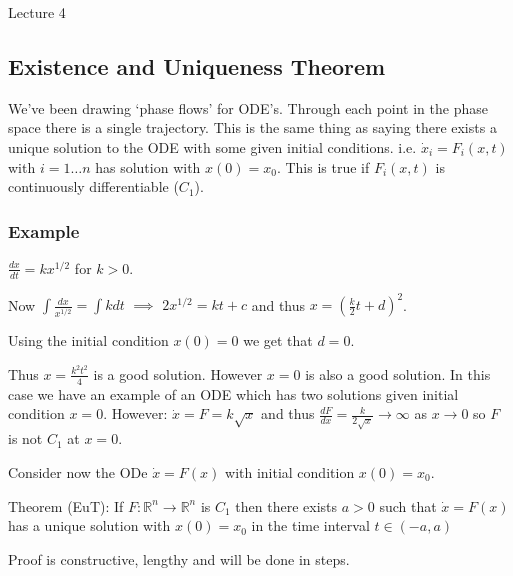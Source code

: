 \begin{center}

Lecture 4

\end{center}

\subsection{Existence and Uniqueness Theorem}

We've been drawing `phase flows' for ODE's. Through each point in the phase space there is a single trajectory. This is the same thing as saying there exists a unique solution to the ODE with some given initial conditions. i.e. $\dot{x}_i = F_i(x,t)$ with $i = 1 \ldots n$ has solution with $x(0) = x_0$. This is true if $F_i(x,t)$ is continuously differentiable ($C_1$).

\subsubsection{Example}

$\frac{dx}{dt} = k x^{1/2}$ for $k>0$.

Now $\int \frac{dx}{x^{1/2}} = \int k dt$ $\implies$ $2x^{1/2} = kt + c$ and thus $x = (\frac{k}{2} t + d)^2$.

Using the initial condition $x(0) = 0$ we get that $d=0$.

Thus $x = \frac{k^2 t^2}{4}$ is a good solution. However $x=0$ is also a good solution. In this case we have an example of an ODE which has two solutions given initial condition $x=0$. However: $\dot{x} = F = k \sqrt{x}$ and thus $\frac{dF}{dx} = \frac{k}{2 \sqrt{x}} \rightarrow \infty$ as $x \rightarrow 0$ so $F$ is not $C_1$ at $x=0$.

\vspace{\baselineskip}

Consider now the ODe $\dot{x} = F(x)$ with initial condition $x(0) = x_0$.

Theorem (EuT): If $F: \mathbb{R}^n \rightarrow \mathbb{R}^n$ is $C_1$ then there exists $a>0$ such that $\dot{x} = F(x)$ has a unique solution with $x(0) = x_0$ in the time interval $t \in (-a, a)$ 

\vspace{\baselineskip}

Proof is constructive, lengthy and will be done in steps.

